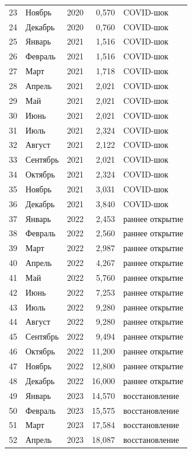\begin{center}
\begin{longtable}{c l c r l}
23 & Ноябрь   & 2020 & 0,570  & COVID-шок \\
24 & Декабрь  & 2020 & 0,760  & COVID-шок \\
25 & Январь   & 2021 & 1,516  & COVID-шок \\
26 & Февраль  & 2021 & 1,516  & COVID-шок \\
27 & Март     & 2021 & 1,718  & COVID-шок \\
28 & Апрель   & 2021 & 2,021  & COVID-шок \\
29 & Май      & 2021 & 2,021  & COVID-шок \\
30 & Июнь     & 2021 & 2,021  & COVID-шок \\
31 & Июль     & 2021 & 2,324  & COVID-шок \\
32 & Август   & 2021 & 2,122  & COVID-шок \\
33 & Сентябрь & 2021 & 2,021  & COVID-шок \\
34 & Октябрь  & 2021 & 2,324  & COVID-шок \\
35 & Ноябрь   & 2021 & 3,031  & COVID-шок \\
36 & Декабрь  & 2021 & 3,840  & COVID-шок \\
37 & Январь   & 2022 & 2,453  & раннее открытие \\
38 & Февраль  & 2022 & 2,560  & раннее открытие \\
39 & Март     & 2022 & 2,987  & раннее открытие \\
40 & Апрель   & 2022 & 4,267  & раннее открытие \\
41 & Май      & 2022 & 5,760  & раннее открытие \\
42 & Июнь     & 2022 & 7,253  & раннее открытие \\
43 & Июль     & 2022 & 9,280  & раннее открытие \\
44 & Август   & 2022 & 9,280  & раннее открытие \\
45 & Сентябрь & 2022 & 9,494  & раннее открытие \\
46 & Октябрь  & 2022 & 11,200 & раннее открытие \\
47 & Ноябрь   & 2022 & 12,800 & раннее открытие \\
48 & Декабрь  & 2022 & 16,000 & раннее открытие \\
49 & Январь   & 2023 & 14,570 & восстановление \\
50 & Февраль  & 2023 & 15,575 & восстановление \\
51 & Март     & 2023 & 17,584 & восстановление \\
52 & Апрель   & 2023 & 18,087 & восстановление \\

\end{longtable}
\end{center}
